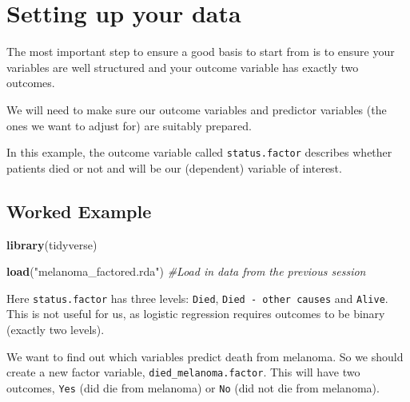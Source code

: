 \documentclass[12pt,]{krantz}
\makeatletter
\newenvironment{Shaded}{\begin{snugshade}}{\end{snugshade}}
\newcommand{\CommentTok}[1]{\textcolor[rgb]{0.56,0.35,0.01}{\textit{#1}}}
\newcommand{\KeywordTok}[1]{\textcolor[rgb]{0.13,0.29,0.53}{\textbf{#1}}}
\newcommand{\NormalTok}[1]{#1}
\newcommand{\OperatorTok}[1]{\textcolor[rgb]{0.81,0.36,0.00}{\textbf{#1}}}
\newcommand{\StringTok}[1]{\textcolor[rgb]{0.31,0.60,0.02}{#1}}
\newenvironment{kframe}{%
\medskip{}
\setlength{\fboxsep}{.8em}
 \def\at@end@of@kframe{}%
 \ifinner\ifhmode%
  \def\at@end@of@kframe{\end{minipage}}%
  \begin{minipage}{\columnwidth}%
 \fi\fi%
 \def\FrameCommand##1{\hskip\@totalleftmargin \hskip-\fboxsep
 \colorbox{shadecolor}{##1}\hskip-\fboxsep
     \hskip-\linewidth \hskip-\@totalleftmargin \hskip\columnwidth}%
 \MakeFramed {\advance\hsize-\width
   \@totalleftmargin\z@ \linewidth\hsize
   \@setminipage}}%
 {\par\unskip\endMakeFramed%
 \at@end@of@kframe}
\renewenvironment{Shaded}{\begin{kframe}}{\end{kframe}}
\theoremstyle{definition}
\theoremstyle{definition}
\theoremstyle{definition}
\theoremstyle{remark}
\makeatother
\begin{document}
\hypertarget{setting-up-your-data}{%
\section{Setting up your data}\label{setting-up-your-data}}

The most important step to ensure a good basis to start from is to
ensure your variables are well structured and your outcome variable has
exactly two outcomes.

We will need to make sure our outcome variables and predictor variables
(the ones we want to adjust for) are suitably prepared.

In this example, the outcome variable called \texttt{status.factor}
describes whether patients died or not and will be our (dependent)
variable of interest.

\hypertarget{worked-example}{%
\subsection{Worked Example}\label{worked-example}}

\begin{Shaded}
\begin{Highlighting}[]
\KeywordTok{library}\NormalTok{(tidyverse)}

\KeywordTok{load}\NormalTok{(}\StringTok{"melanoma_factored.rda"}\NormalTok{)}
\CommentTok{#Load in data from the previous session}
\end{Highlighting}
\end{Shaded}

Here \texttt{status.factor} has three levels: \texttt{Died},
\texttt{Died\ -\ other\ causes} and \texttt{Alive}. This is not useful
for us, as logistic regression requires outcomes to be binary (exactly
two levels).

We want to find out which variables predict death from melanoma. So we
should create a new factor variable, \texttt{died\_melanoma.factor}.
This will have two outcomes, \texttt{Yes} (did die from melanoma) or
\texttt{No} (did not die from melanoma).

\begin{Shaded}
\end{Shaded}
\end{document}
